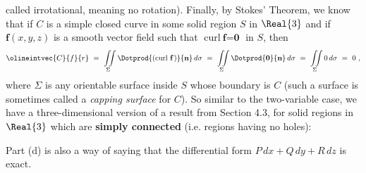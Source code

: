 called irrotational, meaning no rotation).
   Finally, by Stokes' Theorem, we know that if $C$ is a simple closed curve in some solid region $S$ in $\Real{3}$ and if
$\textbf{f}(x,y,z)$ is a smooth vector field such that $\text{curl}~\textbf{f} = \textbf{0}$ in $S$, then
\begin{displaymath}
 \olineintvec{C}{f}{r} ~=~ \iint\limits_{\Sigma} \Dotprod{(\text{curl}~{\textbf{f}}\,)}{\textbf{n}}\,d\sigma ~=~
   \iint\limits_{\Sigma} \Dotprod{\textbf{0}}{\textbf{n}}\,d\sigma ~=~ \iint\limits_{\Sigma} 0\,d\sigma ~=~ 0 ~,
\end{displaymath}
where $\Sigma$ is any orientable surface inside $S$ whose boundary is $C$ (such a surface is sometimes called a
\emph{capping surface} for $C$).
So similar to the two-variable case, we have a three-dimensional version of a result from Section 4.3, for solid regions
in $\Real{3}$ which are \textbf{simply connected} (i.e. regions having no holes):

\vspace{3mm}
\vspace{3mm}

\par\noindent Part (d) is also a way of saying that the differential form $P\,dx + Q\,dy + R\,dz$ is exact.
 
